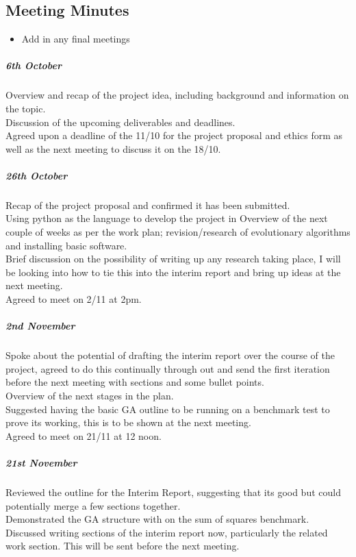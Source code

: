 \documentclass[a4paper]{article}
\begin{document}
\subsection{Meeting Minutes}
\begin{itemize}
	\item Add in any final meetings
\end{itemize}
\subparagraph{6th October}
Overview and recap of the project idea, including background and information on the topic.\\
Discussion of the upcoming deliverables and deadlines.\\
Agreed upon a deadline of the 11/10 for the project proposal and ethics form as well as the next meeting to discuss it on the 18/10.\\
\subparagraph{26th October}
Recap of the project proposal and confirmed it has been submitted.\\
Using python as the language to develop the project in
Overview of the next couple of weeks as per the work plan; revision/research of evolutionary algorithms and installing basic software.\\
Brief discussion on the possibility of writing up any research taking place, I will be looking into how to tie this into the interim report and bring up ideas at the next meeting.\\
Agreed to meet on 2/11 at 2pm.\\
\subparagraph{2nd November}
Spoke about the potential of drafting the interim report over the course of the project, agreed to do this continually through out and send the first iteration before the next meeting with sections and some bullet points.\\
Overview of the next stages in the plan.\\
Suggested having the basic GA outline to be running on a benchmark test to prove its working, this is to be shown at the next meeting.\\
Agreed to meet on 21/11 at 12 noon.\\
\subparagraph{21st November}
Reviewed the outline for the Interim Report, suggesting that its good but could potentially merge a few sections together.\\
Demonstrated the GA structure with on the sum of squares benchmark.\\
Discussed writing sections of the interim report now, particularly the related work section. This will be sent before the next meeting.\\
\end{document}
